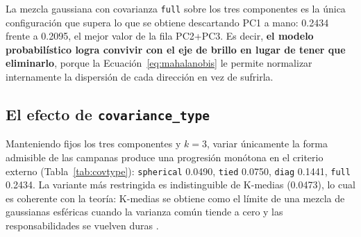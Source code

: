 \documentclass[10pt,journal]{IEEEtran}
\begin{document}
  \begin{table}[H]
    \caption{AMI seg\'un los ejes entregados a cada algoritmo}
    \label{tab:subconjuntos}
    \centering
  \end{table}

  La mezcla gaussiana con covarianza \texttt{full} sobre los tres componentes es la \'unica configuraci\'on que supera lo que se obtiene descartando PC1 a mano: 0.2434 frente a 0.2095, el mejor valor de la fila PC2+PC3. Es decir, \textbf{el modelo probabil\'istico logra convivir con el eje de brillo en lugar de tener que eliminarlo}, porque la Ecuaci\'on~\ref{eq:mahalanobis} le permite normalizar internamente la dispersi\'on de cada direcci\'on en vez de sufrirla.

  \subsection{El efecto de \texttt{covariance\_type}}
  \label{sec:covtype}

  Manteniendo fijos los tres componentes y $k=3$, variar \'unicamente la forma admisible de las campanas produce una progresi\'on mon\'otona en el criterio externo (Tabla~\ref{tab:covtype}): \texttt{spherical} 0.0490, \texttt{tied} 0.0750, \texttt{diag} 0.1441, \texttt{full} 0.2434. La variante m\'as restringida es indistinguible de K-medias (0.0473), lo cual es coherente con la teor\'ia: K-medias se obtiene como el l\'imite de una mezcla de gaussianas esf\'ericas cuando la varianza com\'un tiende a cero y las responsabilidades se vuelven duras \cite[\S9.3.2]{bishop2006}.
\end{document}
